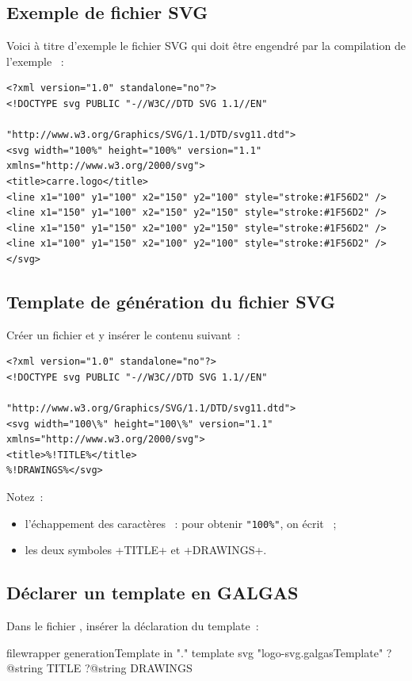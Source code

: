 \subsection{Exemple de fichier SVG}
Voici à titre d'exemple le fichier SVG qui doit être engendré par la compilation de l'exemple ~:

{\singlespacing
\begin{verbatim}
<?xml version="1.0" standalone="no"?>
<!DOCTYPE svg PUBLIC "-//W3C//DTD SVG 1.1//EN"
                              "http://www.w3.org/Graphics/SVG/1.1/DTD/svg11.dtd">
<svg width="100%" height="100%" version="1.1" xmlns="http://www.w3.org/2000/svg">
<title>carre.logo</title>
<line x1="100" y1="100" x2="150" y2="100" style="stroke:#1F56D2" />
<line x1="150" y1="100" x2="150" y2="150" style="stroke:#1F56D2" />
<line x1="150" y1="150" x2="100" y2="150" style="stroke:#1F56D2" />
<line x1="100" y1="150" x2="100" y2="100" style="stroke:#1F56D2" />
</svg>
\end{verbatim}
}

\subsection{Template de génération du fichier SVG}
Créer un fichier  et y insérer le contenu suivant~:
{\singlespacing
\begin{verbatim}
<?xml version="1.0" standalone="no"?>
<!DOCTYPE svg PUBLIC "-//W3C//DTD SVG 1.1//EN"
                                "http://www.w3.org/Graphics/SVG/1.1/DTD/svg11.dtd">
<svg width="100\%" height="100\%" version="1.1" xmlns="http://www.w3.org/2000/svg">
<title>%!TITLE%</title>
%!DRAWINGS%</svg>
\end{verbatim}
}


Notez~:
\begin{itemize}
  \item l'échappement des caractères \tpp{\%}~: pour obtenir \texttt{"100\%"}, on écrit ~;
  \item les deux symboles \ggsq+TITLE+ et \ggsq+DRAWINGS+.
\end{itemize}

\subsection{Déclarer un template en GALGAS}
Dans le fichier , insérer la déclaration du template~:
\begin{galgas4}
filewrapper generationTemplate in "." {
}{
}{
  template svg "logo-svg.galgasTemplate"
    ?@string TITLE
    ?@string DRAWINGS
}
\end{galgas4}

